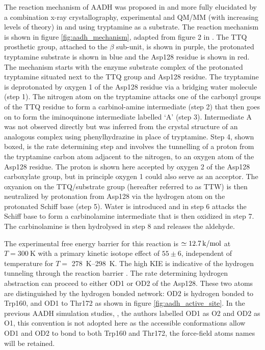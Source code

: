 The reaction mechanism of AADH was proposed in \cite{hyunMechanisticStudiesAromatic1995a} and more fully elucidated by a combination x-ray crystallography, experimental and QM/MM (with increasing levels of theory) in \cite{masgrauAtomicDescriptionEnzyme2006}\cite{masgrauTunnelingClassicalPaths2007} and \cite{ranaghanInitioQMMM2017} using tryptamine as a substrate. 
The reaction mechanism is shown in figure \ref{fig:aadh_mechanism}, adapted from figure 2 in \cite{masgrauAtomicDescriptionEnzyme2006}.  The TTQ prosthetic group, attached to the $\beta$ sub-unit, is shown in purple, the protonated tryptamine substrate is shown in blue and the Asp128 residue is shown in red.  The mechanism starts with the enzyme substrate complex of the protonated tryptamine situated next to the TTQ group and Asp128 residue.  The tryptamine is deprotonated by oxygen 1 of the Asp128 residue via a bridging water molecule (step 1).  The nitrogen atom on the tryptamine attacks one of the carbonyl groups of the TTQ residue to form a carbinol-amine intermediate (step 2) that then goes on to form the iminoquinone intermediate labelled `A' (step 3).  Intermediate A was not observed directly but was inferred from the crystal structure of an analogous complex using phenylhydrazine in place of tryptamine.  Step 4, shown boxed, is the rate determining step and involves the tunnelling of a proton from the tryptamine carbon atom adjacent to the nitrogen, to an oxygen atom of the Asp128 residue.  The proton is shown here accepted by oxygen 2 of the Asp128 carboxylate group, but in principle oxygen 1 could also serve as an acceptor. The oxyanion on the TTQ/substrate group (hereafter referred to as TTW) is then neutralized by protonation from Asp128 via the hydrogen atom on the protonated Schiff base (step 5). Water is introduced and in step 6 attacks the Schiff base to form a carbinolamine intermediate that is then oxidized in step 7.  The carbinolamine is then hydrolysed in step 8 and releases the aldehyde.  


The experimental free energy barrier for this reaction is $\simeq \SI{12.7}{\kilo\cal\per\mol}$ at $T=\SI{300}{\kelvin}$ with a primary kinetic isotope effect of $55 \pm 6$, independent of temperature for $T =$ \SIrange{278}{298}{\kelvin}\cite{masgrauAtomicDescriptionEnzyme2006}. The high KIE is indicative of the hydrogen tunneling through the reaction barrier  \cite{masgrauAtomicDescriptionEnzyme2006}\cite{kohenEnzymeCatalysisClassical1998}\cite{antoniouInternalEnzymeMotions2001}\cite{antoniouLargeKineticIsotope1997}\cite{allemannQuantumTunnellingEnzymecatalysed2009}. The rate determining hydrogen abstraction can proceed to either OD1 or OD2 of the Asp128. These two atoms are distinguished by the hydrogen bonded network: OD2 is hydrogen bonded to Trp160, and OD1 to Thr172 as shown in figure \ref{fig:aadh_active_site}. In the previous AADH simulation studies,  \cite{masgrauAtomicDescriptionEnzyme2006}\cite{masgrauTunnelingClassicalPaths2007}\cite{ranaghanInitioQMMM2017}, the authors labelled OD1 as O2 and OD2 as O1, this convention is not adopted here as the accessible conformations allow OD1 and OD2 to bond to both Trp160 and Thr172, the force-field atoms names will be retained. 

